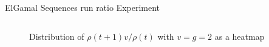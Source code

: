 \begin{frame}{ElGamal Sequences run ratio Experiment}
\begin{columns}
\begin{column}{0.45\textwidth}
\begin{figure}
                \caption{Distribution of $\rho(t+1)v/\rho(t)$ with $v = g = 2$ as a heatmap}
            \end{figure}
        \end{column}
    \end{columns}
\end{frame}

 	

